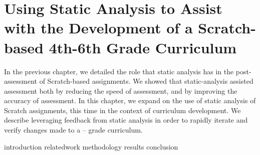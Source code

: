 \chapter{Using Static Analysis to Assist with the Development of a
  Scratch-based 4th-6th Grade Curriculum}
\label{chap:curriculum}

\def\currentprefix{curriculum}

In the previous chapter, we detailed the role that static analysis has in the
post-assessment of Scratch-based assignments. We showed that static-analysis
assisted assessment both by reducing the speed of assessment, and by improving
the accuracy of assessment. In this chapter, we expand on the use of static
analysis of Scratch assignments, this time in the context of curriculum
development. We describe leveraging feedback from static analysis in order to
rapidly iterate and verify changes made to a  --  grade
curriculum.

{introduction}
{relatedwork}
{methodology}
{results}
{conclusion}
